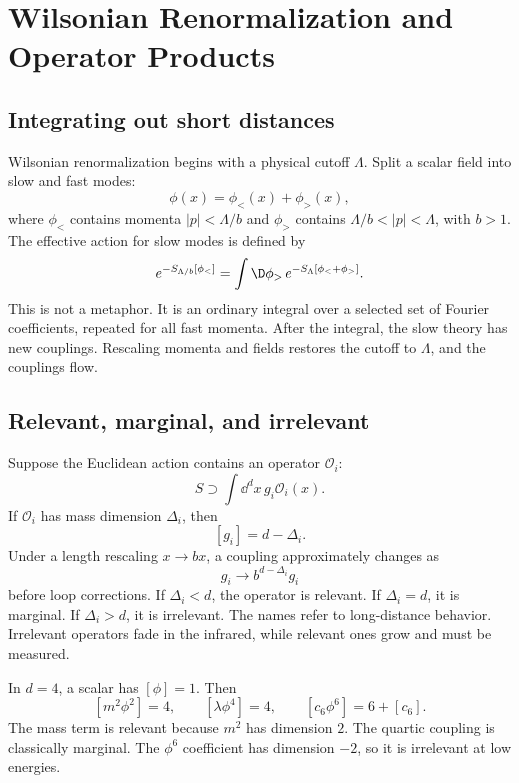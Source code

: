 \chapter{Wilsonian Renormalization and Operator Products}

\section{Integrating out short distances}

Wilsonian renormalization begins with a physical cutoff \(\Lambda\).  Split a scalar field into slow and fast modes:
\[
  \phi(x)=\phi_<(x)+\phi_>(x),
\]
where \(\phi_<\) contains momenta \(|p|<\Lambda/b\) and \(\phi_>\) contains \(\Lambda/b<|p|<\Lambda\), with \(b>1\).  The effective action for slow modes is defined by
\[
  e^{-S_{\Lambda/b}[\phi_<]}
  =
  \int\D\phi_>\,e^{-S_\Lambda[\phi_<+\phi_>]}.
\]
This is not a metaphor.  It is an ordinary integral over a selected set of Fourier coefficients, repeated for all fast momenta.  After the integral, the slow theory has new couplings.  Rescaling momenta and fields restores the cutoff to \(\Lambda\), and the couplings flow.

\section{Relevant, marginal, and irrelevant}

Suppose the Euclidean action contains an operator \(\mathcal O_i\):
\[
  S\supset \int\dd^dx\,g_i\mathcal O_i(x).
\]
If \(\mathcal O_i\) has mass dimension \(\Delta_i\), then
\[
  [g_i]=d-\Delta_i.
\]
Under a length rescaling \(x\to bx\), a coupling approximately changes as
\[
  g_i\to b^{d-\Delta_i}g_i
\]
before loop corrections.  If \(\Delta_i<d\), the operator is relevant.  If \(\Delta_i=d\), it is marginal.  If \(\Delta_i>d\), it is irrelevant.  The names refer to long-distance behavior.  Irrelevant operators fade in the infrared, while relevant ones grow and must be measured.

\begin{example}
In \(d=4\), a scalar has \([\phi]=1\).  Then
\[
  [m^2\phi^2]=4,\qquad [\lambda\phi^4]=4,\qquad [c_6\phi^6]=6+[c_6].
\]
The mass term is relevant because \(m^2\) has dimension \(2\).  The quartic coupling is classically marginal.  The \(\phi^6\) coefficient has dimension \(-2\), so it is irrelevant at low energies.
\end{example}

